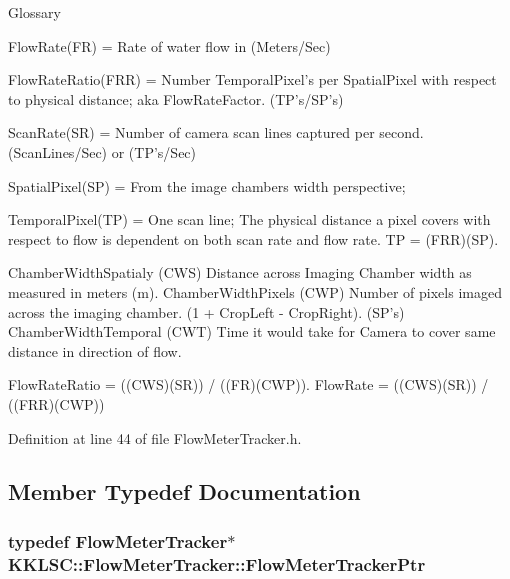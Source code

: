 \begin{DoxyCode}
Glossary


FlowRate(FR) = Rate of water flow in (Meters/Sec)

FlowRateRatio(FRR) = Number TemporalPixel's per SpatialPixel with respect to physical distance; aka 
      FlowRateFactor.  (TP's/SP's)

ScanRate(SR) = Number of camera scan lines captured per second.  (ScanLines/Sec)  or  (TP's/Sec)

SpatialPixel(SP) = From the image chambers width perspective;  

TemporalPixel(TP) = One scan line;  The physical distance a pixel covers with respect to flow is dependent
                on both scan rate and flow rate.   TP = (FRR)(SP).

ChamberWidthSpatialy (CWS)  Distance across Imaging Chamber width as measured in meters (m).
ChamberWidthPixels   (CWP)  Number of pixels imaged across the imaging chamber. (1 + CropLeft - CropRight).
        (SP's)
ChamberWidthTemporal (CWT)  Time it would take for Camera to cover same distance in direction of flow.

 FlowRateRatio = ((CWS)(SR)) / ((FR)(CWP)).
 FlowRate      = ((CWS)(SR)) / ((FRR)(CWP))
\end{DoxyCode}
 

Definition at line 44 of file Flow\+Meter\+Tracker.\+h.



\subsection{Member Typedef Documentation}
\subsubsection[{\texorpdfstring{Flow\+Meter\+Tracker\+Ptr}{FlowMeterTrackerPtr}}]{\setlength{\rightskip}{0pt plus 5cm}typedef {\bf Flow\+Meter\+Tracker}$\ast$ {\bf K\+K\+L\+S\+C\+::\+Flow\+Meter\+Tracker\+::\+Flow\+Meter\+Tracker\+Ptr}}\hypertarget{class_k_k_l_s_c_1_1_flow_meter_tracker_a3e157d685c7b8d014283b6aac91c9e13}{}\label{class_k_k_l_s_c_1_1_flow_meter_tracker_a3e157d685c7b8d014283b6aac91c9e13}


